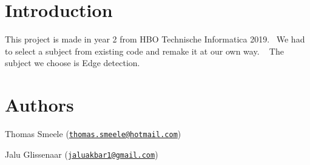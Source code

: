\hypertarget{index_intro_sec}{}\section{Introduction}\label{index_intro_sec}
This project is made in year 2 from H\+BO Technische Informatica 2019.~\newline
 We had to select a subject from existing code and remake it at our own way. ~\newline
 The subject we choose is Edge detection. 

\hypertarget{index_author_sec}{}\section{Authors}\label{index_author_sec}

\begin{DoxyItemize}
\item Thomas Smeele (\href{mailto:thomas.smeele@hotmail.com}{\tt thomas.\+smeele@hotmail.\+com})
\item Jalu Glissenaar (\href{mailto:jaluakbar1@gmail.com}{\tt jaluakbar1@gmail.\+com}) 
\end{DoxyItemize}